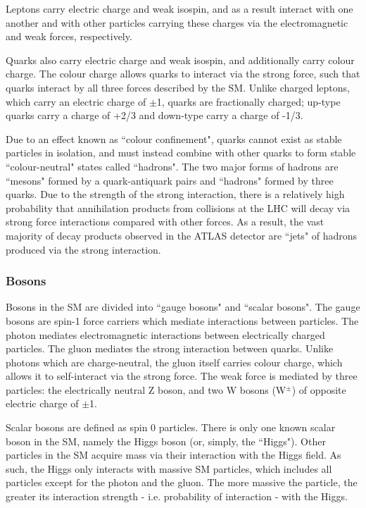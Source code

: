 \documentclass[12pt]{article}
\begin{document}
Leptons carry electric charge and weak isospin, and as a result interact with one another and with other particles carrying these charges via the electromagnetic and weak forces, respectively.  

Quarks also carry electric charge and weak isospin, and additionally carry colour charge. The colour charge allows quarks to interact via the strong force, such that quarks interact by all three forces described by the SM. Unlike charged leptons, which carry an electric charge of $\pm$1, quarks are fractionally charged; up-type quarks carry a charge of +2/3 and down-type carry a charge of -1/3.

Due to an effect known as ``colour confinement", quarks cannot exist as stable particles in isolation, and must instead combine with other quarks to form stable ``colour-neutral" states called ``hadrons". The two major forms of hadrons are ``mesons" formed by a quark-antiquark pairs and ``hadrons" formed by three quarks. Due to the strength of the strong interaction, there is a relatively high probability that annihilation products from collisions at the LHC will decay via strong force interactions compared with other forces. As a result, the vast majority of decay products observed in the ATLAS detector are ``jets" of hadrons produced via the strong interaction. 

\subsubsection{Bosons}

Bosons in the SM are divided into ``gauge bosons" and ``scalar bosons". The gauge bosons are spin-1 force carriers which mediate interactions between particles. The photon mediates electromagnetic interactions between electrically charged particles. The gluon mediates the strong interaction between quarks. Unlike photons which are charge-neutral, the gluon itself carries colour charge, which allows it to self-interact via the strong force. The weak force is mediated by three particles: the electrically neutral Z boson, and two W bosons (W$^\pm$) of opposite electric charge of $\pm$1. 

Scalar bosons are defined as spin 0 particles. There is only one known scalar boson in the SM, namely the Higgs boson (or, simply, the ``Higgs"). Other particles in the SM acquire mass via their interaction with the Higgs field. As such, the Higgs only interacts with massive SM particles, which includes all particles except for the photon and the gluon. The more massive the particle, the greater its interaction strength - i.e. probability of interaction - with the Higgs.
\end{document}
